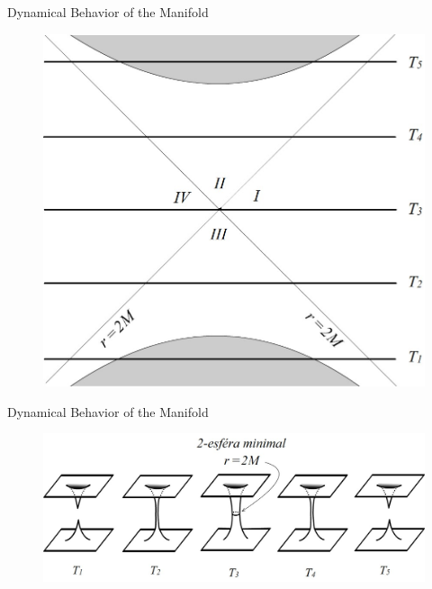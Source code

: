 \documentclass{beamer}
\begin{document}
        \begin{frame}{Dynamical Behavior of the Manifold}
        	\begin{center}
				\begin{figure}
				\includegraphics[scale=0.75] {fig9.jpg}
				\end{figure}
			\end{center}	
        \end{frame}
        
        \begin{frame}{Dynamical Behavior of the Manifold}
        	\begin{center}
				\begin{figure}
				\includegraphics[scale=0.75] {fig10.jpg}
				\end{figure}
			\end{center}	
        \end{frame}
      
\end{document}
